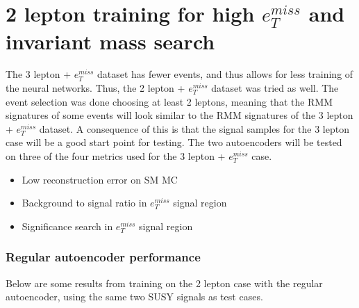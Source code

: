 
\section{2 lepton training for high $e_T^{miss}$ and invariant mass search}\label{sec:2lep}

The 3 lepton + $e_T^{miss}$ dataset has fewer events, and thus allows for less training of the neural networks. 
Thus, the 2 lepton + $e_T^{miss}$ dataset was tried as well. The event selection was done choosing at least 
2 leptons, meaning that the RMM signatures of some events will look similar to the RMM signatures of 
the 3 lepton + $e_T^{miss}$ dataset. A consequence of this is that the signal samples for the 3 lepton case 
will be a good start point for testing. The two autoencoders will be tested on three of the 
four metrics used for the 3 lepton + $e_T^{miss}$ case. 
\begin{itemize}
    \item Low reconstruction error on SM MC
    \item Background to signal ratio in $e_T^{miss}$ signal region
    \item Significance search in $e_T^{miss}$ signal region
\end{itemize}

\subsubsection*{Regular autoencoder performance}
Below are some results from training on the 2 lepton case with the regular autoencoder, using the same two SUSY signals as test cases. 

